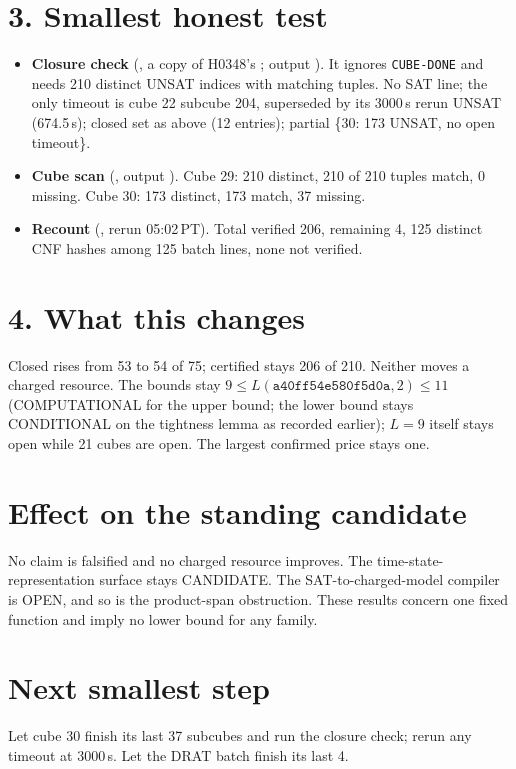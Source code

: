 \documentclass[11pt]{article}
\begin{document}
\section*{3. Smallest honest test}
\begin{itemize}
\item \textbf{Closure check} (, a copy of H0348's ; output ). It ignores \texttt{CUBE-DONE} and needs 210 distinct UNSAT indices with matching tuples. No SAT line; the only timeout is cube 22 subcube 204, superseded by its 3000\,s rerun UNSAT (674.5\,s); closed set as above (12 entries); partial \{30: 173 UNSAT, no open timeout\}.
\item \textbf{Cube scan} (, output ). Cube 29: 210 distinct, 210 of 210 tuples match, 0 missing. Cube 30: 173 distinct, 173 match, 37 missing.
\item \textbf{Recount} (, rerun 05:02\,PT). Total verified 206, remaining 4, 125 distinct CNF hashes among 125 batch lines, none not verified.
\end{itemize}

\section*{4. What this changes}
Closed rises from 53 to 54 of 75; certified stays 206 of 210. Neither moves a charged resource. The bounds stay $9\le L(\texttt{a40ff54e580f5d0a},2)\le 11$ (COMPUTATIONAL for the upper bound; the lower bound stays CONDITIONAL on the tightness lemma as recorded earlier); $L=9$ itself stays open while 21 cubes are open. The largest confirmed price stays one.

\section*{Effect on the standing candidate}
No claim is falsified and no charged resource improves. The time-state-representation surface stays CANDIDATE. The SAT-to-charged-model compiler is OPEN, and so is the product-span obstruction. These results concern one fixed function and imply no lower bound for any family.

\section*{Next smallest step}
Let cube 30 finish its last 37 subcubes and run the closure check; rerun any timeout at 3000\,s. Let the DRAT batch finish its last 4.
\end{document}
